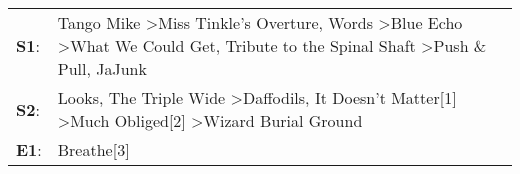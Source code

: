 \begin{supertabular}{p{0.03\textwidth}p{0.92\textwidth}}
 \textbf{S1}:  &  Tango Mike\textsuperscript{} \textgreater \enspace Miss Tinkle's Overture\textsuperscript{}, \enspace Words\textsuperscript{} \textgreater \enspace Blue Echo\textsuperscript{} \textgreater \enspace What We Could Get\textsuperscript{}, \enspace Tribute to the Spinal Shaft\textsuperscript{} \textgreater \enspace Push \& Pull\textsuperscript{}, \enspace JaJunk\textsuperscript{}  \enspace  \\
 \textbf{S2}:  &                                                                                                Looks\textsuperscript{}, \enspace The Triple Wide\textsuperscript{} \textgreater \enspace Daffodils\textsuperscript{}, \enspace It Doesn't Matter[1]\textsuperscript{} \textgreater \enspace Much Obliged[2]\textsuperscript{} \textgreater \enspace Wizard Burial Ground\textsuperscript{}  \enspace  \\
 \textbf{E1}:  &                                                                                                                                                                                                                                                                                                                                                               Breathe[3]\textsuperscript{}  \enspace  \\
\end{supertabular}
